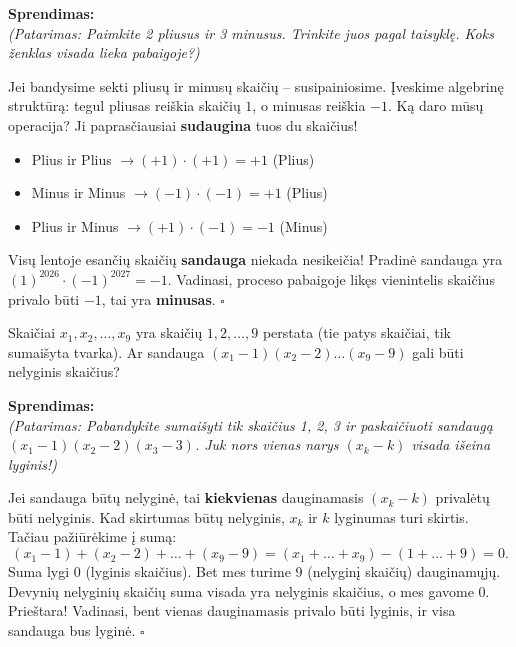 \documentclass[11pt,a4paper]{scrartcl}
\newenvironment{solution}
    {\begin{list}{}{\setlength{\leftmargin}{10pt}\setlength{\rightmargin}{10pt}}\item[]}
    {\end{list}}
\begin{document}
\begin{solution}
\textbf{Sprendimas:}\\
\textit{(Patarimas: Paimkite 2 pliusus ir 3 minusus. Trinkite juos pagal taisyklę. Koks ženklas visada lieka pabaigoje?)}

Jei bandysime sekti pliusų ir minusų skaičių – susipainiosime. Įveskime algebrinę struktūrą: tegul pliusas reiškia skaičių $1$, o minusas reiškia $-1$.
Ką daro mūsų operacija? Ji paprasčiausiai \textbf{sudaugina} tuos du skaičius!
\begin{itemize}
    \item Plius ir Plius $\to (+1) \cdot (+1) = +1$ (Plius)
    \item Minus ir Minus $\to (-1) \cdot (-1) = +1$ (Plius)
    \item Plius ir Minus $\to (+1) \cdot (-1) = -1$ (Minus)
\end{itemize}
Visų lentoje esančių skaičių \textbf{sandauga} niekada nesikeičia! Pradinė sandauga yra $(1)^{2026} \cdot (-1)^{2027} = -1$. Vadinasi, proceso pabaigoje likęs vienintelis skaičius privalo būti $-1$, tai yra \textbf{minusas}. \hfill $\square$
\end{solution}

\begin{example}
Skaičiai $x_1, x_2, \ldots, x_9$ yra skaičių $1, 2, \ldots, 9$ perstata (tie patys skaičiai, tik sumaišyta tvarka). Ar sandauga 
$(x_1-1)(x_2-2)\ldots(x_9-9)$ gali būti nelyginis skaičius?
\end{example}

\begin{solution}
\textbf{Sprendimas:}\\
\textit{(Patarimas: Pabandykite sumaišyti tik skaičius 1, 2, 3 ir paskaičiuoti sandaugą $(x_1-1)(x_2-2)(x_3-3)$. Juk nors vienas narys $(x_k - k)$ visada išeina lyginis!)}

Jei sandauga būtų nelyginė, tai \textbf{kiekvienas} dauginamasis $(x_k - k)$ privalėtų būti nelyginis.
Kad skirtumas būtų nelyginis, $x_k$ ir $k$ lyginumas turi skirtis. 
Tačiau pažiūrėkime į sumą:
\[
(x_1-1) + (x_2-2) + \ldots + (x_9-9) = (x_1+\ldots+x_9) - (1+\ldots+9) = 0.
\]
Suma lygi $0$ (lyginis skaičius). Bet mes turime 9 (nelyginį skaičių) dauginamųjų. Devynių nelyginių skaičių suma visada yra nelyginis skaičius, o mes gavome $0$. Prieštara! Vadinasi, bent vienas dauginamasis privalo būti lyginis, ir visa sandauga bus lyginė. \hfill $\square$
\end{solution}
\end{document}
